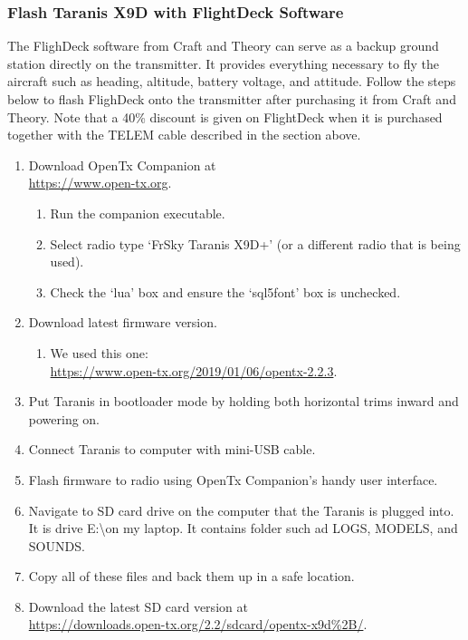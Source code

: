 \documentclass[12pt,journal,compsoc]{IEEEtran}
\begin{document}
\subsubsection{Flash Taranis X9D with FlightDeck Software}
The FlighDeck software from Craft and Theory can serve as a backup ground station directly on the transmitter. It provides everything necessary to fly the aircraft such as heading, altitude, battery voltage, and attitude. Follow the steps below to flash FlighDeck onto the transmitter after purchasing it from Craft and Theory. Note that a 40\% discount is given on FlightDeck when it is purchased together with the TELEM cable described in the section above.
\begin{enumerate}
\item Download OpenTx Companion at\\ \href{https://www.open-tx.org}{https://www.open-tx.org}.
\begin{enumerate}
\item Run the companion executable.
\item Select radio type `FrSky Taranis X9D+' (or a different radio that is being used).
\item Check the `lua' box and ensure the `sql5font' box is unchecked.
\end{enumerate}
\item Download latest firmware version.
\begin{enumerate}
\item We used this one:\\ \href{https://www.open-tx.org/2019/01/06/opentx-2.2.3}{https://www.open-tx.org/2019/01/06/opentx-2.2.3}.
\end{enumerate}
\item Put Taranis in bootloader mode by holding both horizontal trims inward and powering on.
\item Connect Taranis to computer with mini-USB cable.
\item Flash firmware to radio using OpenTx Companion's handy user interface.
\item Navigate to SD card drive on the computer that the Taranis is plugged into. It is drive E:\textbackslash on my laptop. It contains folder such ad LOGS, MODELS, and SOUNDS.
\item Copy all of these files and back them up in a safe location.
\item Download the latest SD card version at\\ \href{https://downloads.open-tx.org/2.2/sdcard/opentx-x9d%2B/}{https://downloads.open-tx.org/2.2/sdcard/opentx-x9d\%2B/}. %

\end{enumerate}
\end{document}
